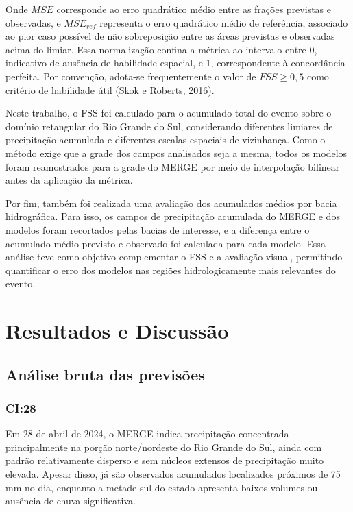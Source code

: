 \documentclass[12pt,a4paper,oneside]{book}
\begin{document}
Onde \(MSE\) corresponde ao erro quadrático médio entre as frações previstas e observadas, e \(MSE_{ref}\) representa o erro quadrático médio de referência, associado ao pior caso possível de não sobreposição entre as áreas previstas e observadas acima do limiar. Essa normalização confina a métrica ao intervalo entre 0, indicativo de ausência de habilidade espacial, e 1, correspondente à concordância perfeita. Por convenção, adota-se frequentemente o valor de \(FSS \geq 0{,}5\) como critério de habilidade útil (Skok e Roberts, 2016).

Neste trabalho, o FSS foi calculado para o acumulado total do evento sobre o domínio retangular do Rio Grande do Sul, considerando diferentes limiares de precipitação acumulada e diferentes escalas espaciais de vizinhança. Como o método exige que a grade dos campos analisados seja a mesma, todos os modelos foram reamostrados para a grade do MERGE por meio de interpolação bilinear antes da aplicação da métrica.

Por fim, também foi realizada uma avaliação dos acumulados médios por bacia hidrográfica. Para isso, os campos de precipitação acumulada do MERGE e dos modelos foram recortados pelas bacias de interesse, e a diferença entre o acumulado médio previsto e observado foi calculada para cada modelo. Essa análise teve como objetivo complementar o FSS e a avaliação visual, permitindo quantificar o erro dos modelos nas regiões hidrologicamente mais relevantes do evento.

\chapter{Resultados e Discussão}

\section{Análise bruta das previsões}

\subsection{CI:28}

Em 28 de abril de 2024, o MERGE indica precipitação concentrada principalmente na porção norte/nordeste do Rio Grande do Sul, ainda com padrão relativamente disperso e sem núcleos extensos de precipitação muito elevada. Apesar disso, já são observados acumulados localizados próximos de 75 mm no dia, enquanto a metade sul do estado apresenta baixos volumes ou ausência de chuva significativa.
\end{document}
